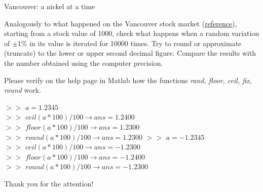 \documentclass[xcolor={dvipsnames,rgb}, aspectratio=169]{beamer}
\begin{document}
\begin{frame}{Vancouver: a nickel at a time}
   \vspace{-.5cm}
   \small{Analogously to what happened on the Vancouver stock market
   (\href{https://slate.com/technology/2019/10/round-floor-software-errors-stock-market-battlefield.html}{reference}),
   starting from a stock value of 1000, check what happens when a random variation of
   $\pm1\%$ in its value is iterated for 10000 times. Try to round or approximate
   (truncate) to the lower or upper \alert{second} decimal figure. Compare the results
   with the number obtained using the computer precision.

   Please verify on the help page in Matlab how the functions {\it rand, floor, ceil,
   fix, round} work.

   \begin{tcolorbox}[colback=white,colframe=bluepoli, sidebyside]
      $>>$ $a = 1.2345$\\
      $>>$ $ceil(a*100)/100 \longrightarrow ans = 1.2400$\\
      $>>$ $floor(a*100)/100 \longrightarrow ans = 1.2300$\\
      $>>$ $round(a*100)/100 \longrightarrow ans = 1.2300$
      \tcblower
      $>>$ $a = -1.2345$\\
      $>>$ $ceil(a*100)/100 \longrightarrow ans = -1.2300$\\
      $>>$ $floor(a*100)/100 \longrightarrow ans = -1.2400$\\
      $>>$ $round(a*100)/100 \longrightarrow ans = -1.2300$
   \end{tcolorbox}}
\end{frame}

{%
   \begin{frame}[standout]
      Thank you for the attention!
   \end{frame}
}

\end{document}
